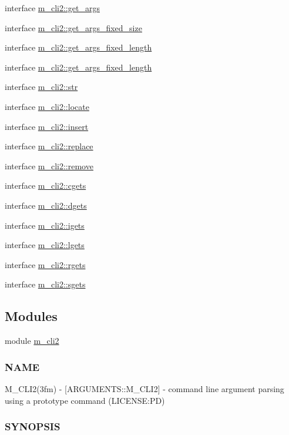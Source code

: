\begin{DoxyCompactItemize}
\item 
interface \mbox{\hyperlink{interfacem__cli2_1_1get__args}{m\+\_\+cli2\+::get\+\_\+args}}
\item 
interface \mbox{\hyperlink{interfacem__cli2_1_1get__args__fixed__size}{m\+\_\+cli2\+::get\+\_\+args\+\_\+fixed\+\_\+size}}
\item 
interface \mbox{\hyperlink{interfacem__cli2_1_1get__args__fixed__length}{m\+\_\+cli2\+::get\+\_\+args\+\_\+fixed\+\_\+length}}
\item 
interface \mbox{\hyperlink{interfacem__cli2_1_1get__args__fixed__length}{m\+\_\+cli2\+::get\+\_\+args\+\_\+fixed\+\_\+length}}
\item 
interface \mbox{\hyperlink{interfacem__cli2_1_1str}{m\+\_\+cli2\+::str}}
\item 
interface \mbox{\hyperlink{interfacem__cli2_1_1locate}{m\+\_\+cli2\+::locate}}
\item 
interface \mbox{\hyperlink{interfacem__cli2_1_1insert}{m\+\_\+cli2\+::insert}}
\item 
interface \mbox{\hyperlink{interfacem__cli2_1_1replace}{m\+\_\+cli2\+::replace}}
\item 
interface \mbox{\hyperlink{interfacem__cli2_1_1remove}{m\+\_\+cli2\+::remove}}
\item 
interface \mbox{\hyperlink{interfacem__cli2_1_1cgets}{m\+\_\+cli2\+::cgets}}
\item 
interface \mbox{\hyperlink{interfacem__cli2_1_1dgets}{m\+\_\+cli2\+::dgets}}
\item 
interface \mbox{\hyperlink{interfacem__cli2_1_1igets}{m\+\_\+cli2\+::igets}}
\item 
interface \mbox{\hyperlink{interfacem__cli2_1_1lgets}{m\+\_\+cli2\+::lgets}}
\item 
interface \mbox{\hyperlink{interfacem__cli2_1_1rgets}{m\+\_\+cli2\+::rgets}}
\item 
interface \mbox{\hyperlink{interfacem__cli2_1_1sgets}{m\+\_\+cli2\+::sgets}}
\end{DoxyCompactItemize}
\subsection*{Modules}
\begin{DoxyCompactItemize}
\item 
module \mbox{\hyperlink{namespacem__cli2}{m\+\_\+cli2}}
\begin{DoxyCompactList}\small\item\em \subsubsection*{N\+A\+ME}

M\+\_\+\+C\+L\+I2(3fm) -\/ \mbox{[}A\+R\+G\+U\+M\+E\+N\+T\+S\+::\+M\+\_\+\+C\+L\+I2\mbox{]} -\/ command line argument parsing using a prototype command (L\+I\+C\+E\+N\+SE\+:PD) \subsubsection*{S\+Y\+N\+O\+P\+S\+IS}\end{DoxyCompactList}\end{DoxyCompactItemize}

